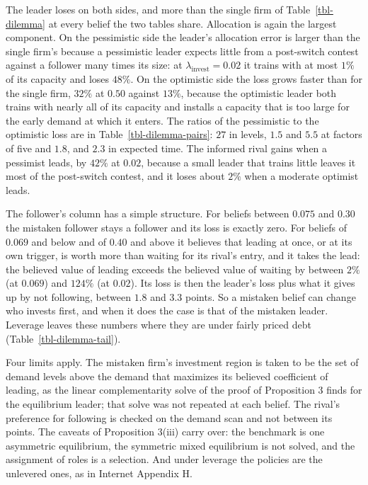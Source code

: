 \documentclass[
  11pt,
  letterpaper,
]{scrartcl}
\begin{document}
\endgroup

The leader loses on both sides, and more than the single firm of
Table~\ref{tbl-dilemma} at every belief the two tables share. Allocation
is again the largest component. On the pessimistic side the leader's
allocation error is larger than the single firm's because a pessimistic
leader expects little from a post-switch contest against a follower many
times its size: at \(\lambda_{\text{invest}} = 0.02\) it trains with at
most \(1\%\) of its capacity and loses \(48\%\). On the optimistic side
the loss grows faster than for the single firm, \(32\%\) at \(0.50\)
against \(13\%\), because the optimistic leader both trains with nearly
all of its capacity and installs a capacity that is too large for the
early demand at which it enters. The ratios of the pessimistic to the
optimistic loss are in Table~\ref{tbl-dilemma-pairs}: \(27\) in levels,
\(1.5\) and \(5.5\) at factors of five and \(1.8\), and \(2.3\) in
expected time. The informed rival gains when a pessimist leads, by
\(42\%\) at \(0.02\), because a small leader that trains little leaves
it most of the post-switch contest, and it loses about \(2\%\) when a
moderate optimist leads.

The follower's column has a simple structure. For beliefs between
\(0.075\) and \(0.30\) the mistaken follower stays a follower and its
loss is exactly zero. For beliefs of \(0.069\) and below and of \(0.40\)
and above it believes that leading at once, or at its own trigger, is
worth more than waiting for its rival's entry, and it takes the lead:
the believed value of leading exceeds the believed value of waiting by
between \(2\%\) (at \(0.069\)) and \(124\%\) (at \(0.02\)). Its loss is
then the leader's loss plus what it gives up by not following, between
\(1.8\) and \(3.3\) points. So a mistaken belief can change who invests
first, and when it does the case is that of the mistaken leader.
Leverage leaves these numbers where they are under fairly priced debt
(Table~\ref{tbl-dilemma-tail}).

Four limits apply. The mistaken firm's investment region is taken to be
the set of demand levels above the demand that maximizes its believed
coefficient of leading, as the linear complementarity solve of the proof
of Proposition 3 finds for the equilibrium leader; that solve was not
repeated at each belief. The rival's preference for following is checked
on the demand scan and not between its points. The caveats of
Proposition 3(iii) carry over: the benchmark is one asymmetric
equilibrium, the symmetric mixed equilibrium is not solved, and the
assignment of roles is a selection. And under leverage the policies are
the unlevered ones, as in Internet Appendix H.
\end{document}
